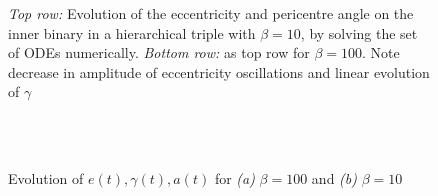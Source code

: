 \documentclass[a4paper,fleqn,usenatbib]{mnras}
\begin{document}
\begin{figure}
	\caption{\textit{Top row:} Evolution of the eccentricity and pericentre angle on the inner binary in a hierarchical triple with $\beta = 10$, by solving the set of ODEs numerically. \textit{Bottom row:} as top row for $\beta = 100$. Note decrease in amplitude of eccentricity oscillations and linear evolution of $\gamma$} \label{fig:eg_exampleB10}
\end{figure}


\begin{figure}
	 \\
	 \\
	\medskip
	\caption{Evolution of $e(t), \gamma(t), a(t)$ for \textit{(a) }$\beta = 100$ and \textit{(b)} $\beta = 10$}
	\label{fig:spinprecession2}
\end{figure}
\end{document}
